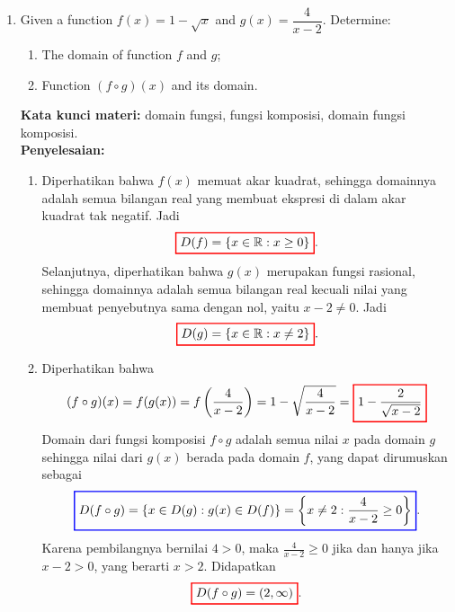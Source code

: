 \documentclass[10pt,openany,a4paper]{article}
\theoremstyle{definition}
\theoremstyle{definition}
\theoremstyle{plain}
\newenvironment{jawab}[2][tes]{%
\par\noindent\textbf{Kata kunci materi:} #1.\\
\textbf{Penyelesaian:} #2%
}{}
\begin{document}
\begin{enumerate}
    \item Given a function $f(x)=1-\sqrt{x}$ and $g(x)=\dfrac{4}{x-2}$. Determine:
    \begin{enumerate}
        \item[a)] The domain of function $f$ and $g$;
        \item[b)] Function $(f\circ g)(x)$ and its domain.
    \end{enumerate}
    \begin{jawab}[domain fungsi, fungsi komposisi, domain fungsi komposisi]{
        \begin{enumerate}
            \item Diperhatikan bahwa $f(x)$ memuat akar kuadrat, sehingga domainnya adalah semua bilangan real yang membuat ekspresi di dalam akar kuadrat tak negatif. Jadi
            \begin{align*}
                \colorlet{oldcolor}{.}
        \color{red}
        \setlength{\fboxrule}{1pt} \boxed{\color{oldcolor}D(f)=\{x \in \mathbb{R} : x \geq 0\}}\color{oldcolor}.
            \end{align*}
            Selanjutnya, diperhatikan bahwa $g(x)$ merupakan fungsi rasional, sehingga domainnya adalah semua bilangan real kecuali nilai yang membuat penyebutnya sama dengan nol, yaitu $x-2\neq 0$. Jadi
            \begin{align*}
                \colorlet{oldcolor}{.}
        \color{red}
        \setlength{\fboxrule}{1pt} \boxed{\color{oldcolor}D(g)=\{x \in \mathbb{R} : x \neq 2\}}\color{oldcolor}.
            \end{align*}
            \item Diperhatikan bahwa
            \begin{align*}
                (f\circ g)(x) = f(g(x)) = f\left(\frac{4}{x-2}\right) = 1 - \sqrt{\frac{4}{x-2}} = \colorlet{oldcolor}{.}
        \color{red}
        \setlength{\fboxrule}{1pt} \boxed{\color{oldcolor}1 - \frac{2}{\sqrt{x-2}}}\color{oldcolor}
            \end{align*}
            Domain dari fungsi komposisi $f\circ g$ adalah semua nilai $x$ pada domain $g$ sehingga nilai dari $g(x)$ berada pada domain $f$, yang dapat dirumuskan sebagai
            \begin{align*}
                \colorlet{oldcolor}{.}
        \color{blue}
        \setlength{\fboxrule}{1pt} \boxed{\color{oldcolor}D(f\circ g) = \{x \in D(g) : g(x) \in D(f)\} = \left\{x \neq 2 : \frac{4}{x-2} \geq 0\right\}}\color{oldcolor}.
            \end{align*}
            Karena pembilangnya bernilai $4>0$, maka $\frac{4}{x-2} \geq 0$ jika dan hanya jika $x-2 > 0$, yang berarti $x > 2$. Didapatkan
            \begin{align*}
                \colorlet{oldcolor}{.}
        \color{red}
        \setlength{\fboxrule}{1pt} \boxed{\color{oldcolor}D(f\circ g) = (2, \infty)}\color{oldcolor}.
            \end{align*}
        \end{enumerate}
    }
    \end{jawab}


\end{enumerate}
\end{document}
